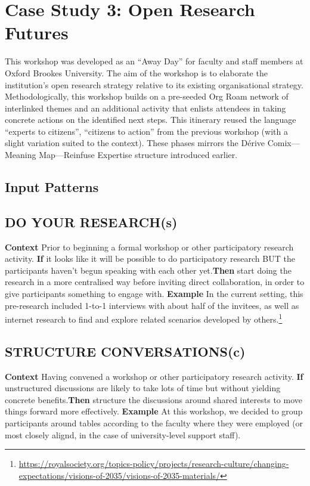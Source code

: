 \documentclass[acmlarge,timestamp]{acmart}
\newcommand{\sensory}{(s)}
\newcommand{\cognitive}{(c)}
\begin{document}
\clearpage
\section{Case Study 3: Open Research Futures}

This workshop was developed as an “Away Day” for faculty and staff
members at Oxford Brookes University.  The aim of the workshop is to
elaborate the institution’s open research strategy relative to its
existing organisational strategy.  Methodologically, this workshop
builds on a pre-seeded Org Roam network of interlinked themes and an
additional activity that enlists attendees in taking concrete actions
on the identified next steps.  This itinerary reused the language
“experts to citizens”, “citizens to action” from the previous workshop
(with a slight variation suited to the context).  These phases mirrors
the {\sc Dérive Comix}—{\sc Meaning Map}—{\sc Reinfuse Expertise}
structure introduced earlier.

\subsection{Input Patterns}

\subsection*{DO YOUR RESEARCH{\hfill\sensory}}
\textbf{Context} Prior to beginning a formal workshop or other participatory research activity.\newline
\textbf{If} it looks like it will be possible to do participatory research BUT the participants haven’t begun speaking with each other yet.\newline \textbf{Then}
start doing the research in a more centralised way before inviting direct collaboration, in order to give participants something to engage with.\newline
\textbf{Example} In the current setting, this pre-research included 1-to-1 interviews with about half of the invitees, as well as internet research to find and explore related scenarios developed by others.\footnote{\url{https://royalsociety.org/topics-policy/projects/research-culture/changing-expectations/visions-of-2035/visions-of-2035-materials/}}

\subsection*{STRUCTURE CONVERSATIONS{\hfill\cognitive}}
\textbf{Context} Having convened a workshop or other participatory research activity.\newline
\textbf{If} unstructured discussions are likely to take lots of time but without yielding concrete benefits.\newline \textbf{Then}
structure the discussions around shared interests to move things forward more effectively.\newline
\textbf{Example} At this workshop, we decided to group participants around tables according to the faculty where they were employed (or most closely alignd, in the case of university-level support staff).
\end{document}
